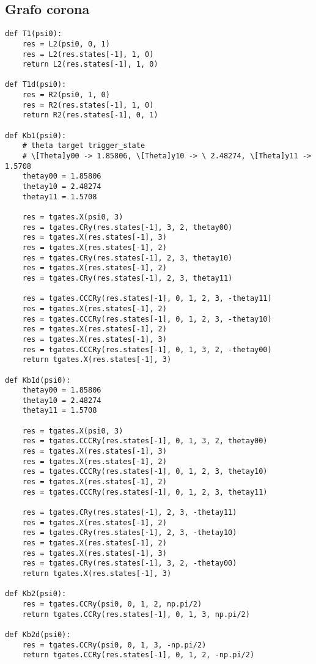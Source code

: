 \subsection{Grafo corona}

\begin{verbatim}
def T1(psi0):
    res = L2(psi0, 0, 1)
    res = L2(res.states[-1], 1, 0)
    return L2(res.states[-1], 1, 0)

def T1d(psi0):
    res = R2(psi0, 1, 0)
    res = R2(res.states[-1], 1, 0)
    return R2(res.states[-1], 0, 1)

def Kb1(psi0):
    # theta target trigger_state
    # \[Theta]y00 -> 1.85806, \[Theta]y10 -> \ 2.48274, \[Theta]y11 -> 1.5708
    thetay00 = 1.85806
    thetay10 = 2.48274
    thetay11 = 1.5708

    res = tgates.X(psi0, 3)
    res = tgates.CRy(res.states[-1], 3, 2, thetay00)
    res = tgates.X(res.states[-1], 3)
    res = tgates.X(res.states[-1], 2)
    res = tgates.CRy(res.states[-1], 2, 3, thetay10)
    res = tgates.X(res.states[-1], 2)
    res = tgates.CRy(res.states[-1], 2, 3, thetay11)

    res = tgates.CCCRy(res.states[-1], 0, 1, 2, 3, -thetay11)
    res = tgates.X(res.states[-1], 2)
    res = tgates.CCCRy(res.states[-1], 0, 1, 2, 3, -thetay10)
    res = tgates.X(res.states[-1], 2)
    res = tgates.X(res.states[-1], 3)
    res = tgates.CCCRy(res.states[-1], 0, 1, 3, 2, -thetay00)
    return tgates.X(res.states[-1], 3)

def Kb1d(psi0):
    thetay00 = 1.85806
    thetay10 = 2.48274
    thetay11 = 1.5708

    res = tgates.X(psi0, 3)
    res = tgates.CCCRy(res.states[-1], 0, 1, 3, 2, thetay00)
    res = tgates.X(res.states[-1], 3)
    res = tgates.X(res.states[-1], 2)
    res = tgates.CCCRy(res.states[-1], 0, 1, 2, 3, thetay10)
    res = tgates.X(res.states[-1], 2)
    res = tgates.CCCRy(res.states[-1], 0, 1, 2, 3, thetay11)

    res = tgates.CRy(res.states[-1], 2, 3, -thetay11)
    res = tgates.X(res.states[-1], 2)
    res = tgates.CRy(res.states[-1], 2, 3, -thetay10)
    res = tgates.X(res.states[-1], 2)
    res = tgates.X(res.states[-1], 3)
    res = tgates.CRy(res.states[-1], 3, 2, -thetay00)
    return tgates.X(res.states[-1], 3)

def Kb2(psi0):
    res = tgates.CCRy(psi0, 0, 1, 2, np.pi/2)
    return tgates.CCRy(res.states[-1], 0, 1, 3, np.pi/2)

def Kb2d(psi0):
    res = tgates.CCRy(psi0, 0, 1, 3, -np.pi/2)
    return tgates.CCRy(res.states[-1], 0, 1, 2, -np.pi/2)


\end{verbatim}
